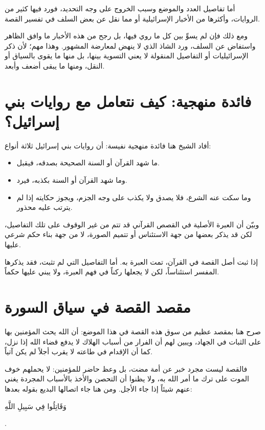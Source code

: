 أما تفاصيل العدد والموضع وسبب الخروج على وجه التحديد، فورد فيها كثير من الروايات، وأكثرها من الأخبار الإسرائيلية أو مما نقل عن بعض السلف في تفسير القصة.

ومع ذلك فإن  لم يسوِّ بين كل ما روي فيها، بل رجح من هذه الأخبار ما وافق الظاهر واستفاض عن السلف، ورد الشاذ الذي لا ينهض لمعارضة المشهور. وهذا مهم؛ لأن ذكر الإسرائيليات أو التفاصيل المنقولة لا يعني التسوية بينها، بل منها ما يقوى بالسياق أو النقل، ومنها ما يبقى أضعف وأبعد.

\section{فائدة منهجية: كيف نتعامل مع روايات بني إسرائيل؟}
أفاد الشيخ هنا فائدة منهجية نفيسة: أن روايات بني إسرائيل ثلاثة أنواع:
\begin{itemize}
    \item ما شهد القرآن أو السنة الصحيحة بصدقه، فيقبل.
    \item وما شهد القرآن أو السنة بكذبه، فيرد.
    \item وما سكت عنه الشرع، فلا يصدق ولا يكذب على وجه الجزم، ويجوز حكايته إذا لم يترتب عليه محذور.
\end{itemize}

وبيّن أن العبرة الأصلية في القصص القرآني قد تتم من غير الوقوف على تلك التفاصيل، لكن قد يذكر بعضها من جهة الاستئناس أو تتميم الصورة، لا من جهة بناء حكم شرعي عليها.

\begin{fawaid}
إذا ثبت أصل القصة في القرآن، تمت العبرة به. أما التفاصيل التي لم تثبت، فقد يذكرها المفسر استئناساً، لكن لا يجعلها ركناً في فهم العبرة، ولا يبني عليها حكماً.
\end{fawaid}

\section{مقصد القصة في سياق السورة}
صرح  هنا بمقصد عظيم من سوق هذه القصة في هذا الموضع: أن الله يحث المؤمنين بها على الثبات في الجهاد، ويبين لهم أن الفرار من أسباب الهلاك لا يدفع قضاء الله إذا نزل، كما أن الإقدام في طاعته لا يقرب أجلاً لم يكن آتياً.

فالقصة ليست مجرد خبر عن أمة مضت، بل وعظ حاضر للمؤمنين: لا يحملهم خوف الموت على ترك ما أمر الله به، ولا يظنوا أن التحصن والأخذ بالأسباب المجردة يغني عنهم شيئاً إذا جاء الأجل. ومن هنا جاء اتصالها البديع بقوله بعدها: \begin{ayah}وَقَاتِلُوا فِي سَبِيلِ اللَّهِ\end{ayah}.

